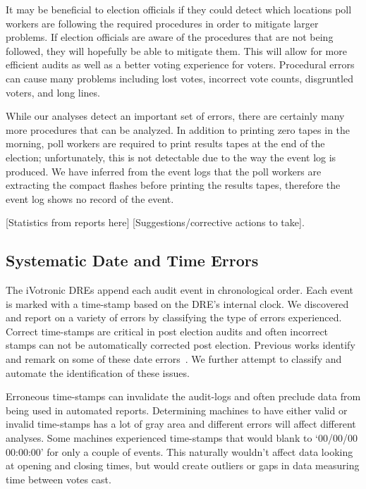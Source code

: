 It may be beneficial to election officials if they could detect which locations poll workers are following the required procedures in order to mitigate larger problems.  If election officials are aware of the procedures that are not being followed, they will hopefully be able to mitigate them.  This will allow for more efficient audits as well as a better voting experience for voters.  Procedural errors can cause many problems including lost votes, incorrect vote counts, disgruntled voters, and long lines.

While our analyses detect an important set of errors, there are certainly many more procedures that can be analyzed.  In addition to printing zero tapes in the morning, poll workers are required to print results tapes at the end of the election; unfortunately, this is not detectable due to the way the event log is produced.  We have inferred from the event logs that the poll workers are extracting the compact flashes before printing the results tapes, therefore the event log shows no record of the event.  

[Statistics from reports here] [Suggestions/corrective actions to take].

\subsection{Systematic Date and Time Errors}\label{an:date}
The iVotronic DREs append each audit event in chronological order.  Each event is marked with a time-stamp based on the DRE's internal clock.  We discovered and report on a variety of errors by classifying the type of errors experienced. Correct time-stamps are critical in post election audits and often incorrect stamps can not be automatically corrected post election.  Previous works identify and remark on some of these date errors~\cite{Buell2011,Sandler2007}.  We further attempt to classify and automate the identification of these issues.

Erroneous time-stamps can invalidate the audit-logs and often preclude data from being used in automated reports.  Determining machines to have either valid or invalid time-stamps has a lot of gray area and different errors will affect different analyses.  Some machines experienced time-stamps that would blank to \textquoteleft 00/00/00 00:00:00' for only a couple of events.  This naturally wouldn't affect data looking at opening and closing times, but would create outliers or gaps in data measuring time between votes cast.  

